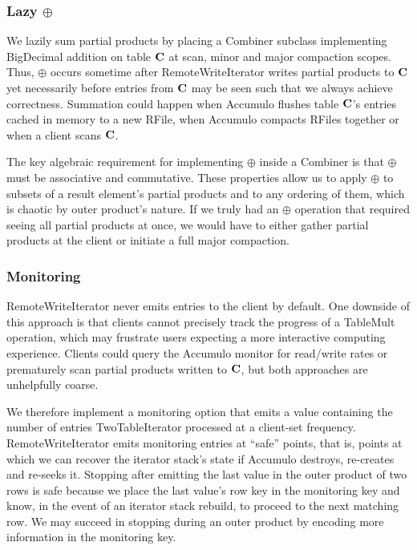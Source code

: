 \subsubsection{Lazy $\oplus$}
We lazily sum partial products by placing a Combiner subclass implementing BigDecimal addition 
on table $\mathbf{C}$ at scan, minor and major compaction scopes.
Thus, $\oplus$ occurs sometime after RemoteWriteIterator writes partial products to $\mathbf{C}$
yet necessarily before entries from $\mathbf{C}$ may be seen such that we always achieve correctness.
Summation could happen when Accumulo flushes table $\mathbf{C}$'s entries cached in memory to a new RFile, 
when Accumulo compacts RFiles together or when a client scans $\mathbf{C}$. 

The key algebraic requirement for implementing $\oplus$ inside a Combiner
is that $\oplus$ must be associative and commutative.
These properties allow us to apply $\oplus$ to subsets of a result element's partial products 
and to any ordering of them, which is chaotic by outer product's nature.
If we truly had an $\oplus$ operation that required seeing all partial products at once,
we would have to either gather partial products at the client or initiate a full major compaction.

\subsubsection{Monitoring}
RemoteWriteIterator never emits entries to the client by default. 
One downside of this approach is that clients cannot precisely track the progress of a TableMult operation,
which may frustrate users expecting a more interactive computing experience.
Clients could query the Accumulo monitor for read/write rates 
or prematurely scan partial products written to $\mathbf{C}$, but both approaches are unhelpfully coarse.

We therefore implement a monitoring option that emits a value
containing the number of entries TwoTableIterator processed
at a client-set frequency.
RemoteWriteIterator emits monitoring entries at ``safe'' points, that is,
points at which we can recover the iterator stack's state 
if Accumulo destroys, re-creates and re-seeks it.
Stopping after emitting the last value in the outer product of two rows is safe 
because we place the last value's row key in the monitoring key and know, 
in the event of an iterator stack rebuild, to proceed to the next matching row.
We may succeed in stopping during an outer product 
by encoding more information in the monitoring key.


